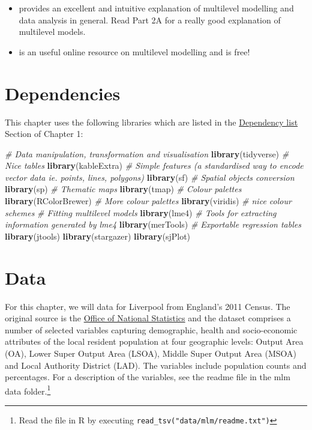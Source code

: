 \documentclass[
]{book}
\newenvironment{Shaded}{\begin{snugshade}}{\end{snugshade}}
\newcommand{\CommentTok}[1]{\textcolor[rgb]{0.56,0.35,0.01}{\textit{#1}}}
\newcommand{\KeywordTok}[1]{\textcolor[rgb]{0.13,0.29,0.53}{\textbf{#1}}}
\newcommand{\NormalTok}[1]{#1}
\providecommand{\tightlist}{%
  \setlength{\itemsep}{0pt}\setlength{\parskip}{0pt}}
\begin{document}
\begin{itemize}
\tightlist
\item
  \citet{Gelman_Hill_2006_book} provides an excellent and intuitive explanation of multilevel modelling and data analysis in general. Read Part 2A for a really good explanation of multilevel models.
\item
  \citet{bristol2020} is an useful online resource on multilevel modelling and is free!
\end{itemize}

\hypertarget{dependencies-4}{%
\section{Dependencies}\label{dependencies-4}}

This chapter uses the following libraries which are listed in the \protect\hyperlink{dependency-list}{Dependency list} Section of Chapter 1:

\begin{Shaded}
\begin{Highlighting}[]
\CommentTok{# Data manipulation, transformation and visualisation}
\KeywordTok{library}\NormalTok{(tidyverse)}
\CommentTok{# Nice tables}
\KeywordTok{library}\NormalTok{(kableExtra)}
\CommentTok{# Simple features (a standardised way to encode vector data ie. points, lines, polygons)}
\KeywordTok{library}\NormalTok{(sf) }
\CommentTok{# Spatial objects conversion}
\KeywordTok{library}\NormalTok{(sp) }
\CommentTok{# Thematic maps}
\KeywordTok{library}\NormalTok{(tmap) }
\CommentTok{# Colour palettes}
\KeywordTok{library}\NormalTok{(RColorBrewer) }
\CommentTok{# More colour palettes}
\KeywordTok{library}\NormalTok{(viridis) }\CommentTok{# nice colour schemes}
\CommentTok{# Fitting multilevel models}
\KeywordTok{library}\NormalTok{(lme4)}
\CommentTok{# Tools for extracting information generated by lme4}
\KeywordTok{library}\NormalTok{(merTools)}
\CommentTok{# Exportable regression tables}
\KeywordTok{library}\NormalTok{(jtools)}
\KeywordTok{library}\NormalTok{(stargazer)}
\KeywordTok{library}\NormalTok{(sjPlot)}
\end{Highlighting}
\end{Shaded}

\hypertarget{data-3}{%
\section{Data}\label{data-3}}

For this chapter, we will data for Liverpool from England's 2011 Census. The original source is the \href{https://www.nomisweb.co.uk/home/census2001.asp}{Office of National Statistics} and the dataset comprises a number of selected variables capturing demographic, health and socio-economic attributes of the local resident population at four geographic levels: Output Area (OA), Lower Super Output Area (LSOA), Middle Super Output Area (MSOA) and Local Authority District (LAD). The variables include population counts and percentages. For a description of the variables, see the readme file in the mlm data folder.\footnote{Read the file in R by executing \texttt{read\_tsv("data/mlm/readme.txt")}}
\end{document}
